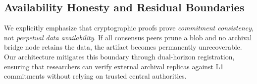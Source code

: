 \subsection{Availability Honesty and Residual Boundaries}
We explicitly emphasize that cryptographic proofs prove \textit{commitment consistency}, not \textit{perpetual data availability}. If all consensus peers prune a blob and no archival bridge node retains the data, the artifact becomes permanently unrecoverable. Our architecture mitigates this boundary through dual-horizon registration, ensuring that researchers can verify external archival replicas against L1 commitments without relying on trusted central authorities.
